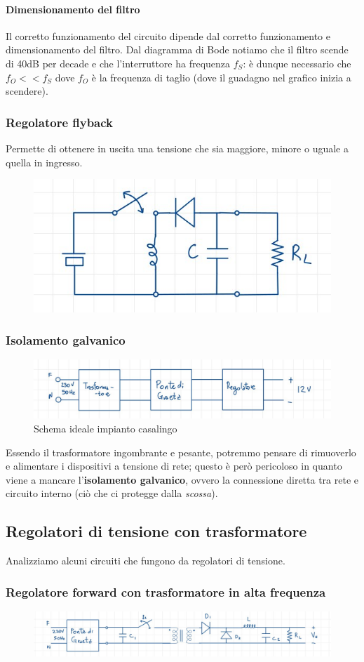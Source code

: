 \documentclass[11pt,a4paper,]{article}
\begin{document}
\paragraph{Dimensionamento del filtro}
Il corretto funzionamento del circuito dipende dal corretto funzionamento e dimensionamento del filtro.
Dal diagramma di Bode notiamo che il filtro scende di 40dB per decade e che l'interruttore ha frequenza $f_S$: è dunque necessario che $f_O<<f_S$ dove $f_O$ è la frequenza di taglio (dove il guadagno nel grafico inizia a scendere).
\subsubsection{Regolatore flyback}
Permette di ottenere in uscita una tensione che sia maggiore, minore o uguale a quella in ingresso.
\begin{figure}[H]
    \centering
    \includegraphics[width=0.5\linewidth]{img/reg flyback.png}
\end{figure}
\subsubsection{Isolamento galvanico}
\begin{figure}[H]
    \centering
    \includegraphics[width=0.5\linewidth]{img/chem imp.png}
    \caption{Schema ideale impianto casalingo}
\end{figure}
Essendo il trasformatore ingombrante e pesante, potremmo pensare di rimuoverlo e alimentare i dispositivi a tensione di rete; questo è però pericoloso in quanto viene a mancare l'\textbf{isolamento galvanico}, ovvero la connessione diretta tra rete e circuito interno (ciò che ci protegge dalla \textit{scossa}).
\subsection{Regolatori di tensione con trasformatore}
Analizziamo alcuni circuiti che fungono da regolatori di tensione.
\subsubsection{Regolatore forward con trasformatore in alta frequenza}
\begin{figure}[H]
    \centering
    \includegraphics[width=0.5\linewidth]{img/reg fow con t in freq.png}
\end{figure}
\end{document}
